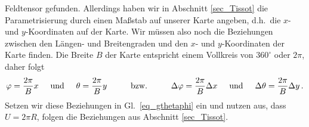 Feldtensor gefunden. Allerdings haben wir in Abschnitt \ref{sec_Tissot} die Parametrisierung durch einen
Ma\ss stab auf unserer Karte angeben, d.h.\ die $x$- und $y$-Koordinaten auf der Karte. Wir m\"ussen also noch
die Beziehungen zwischen den L\"angen- und Breitengraden und den $x$- und $y$-Koordinaten der Karte
finden. Die Breite $B$ der Karte entspricht einem Vollkreis von $360^\circ$ oder $2 \pi$, daher folgt
\begin{equation}
\label{eq_Beztheta_z1}
         \varphi = \frac{2\pi}{B} x  \hspace{0.5cm} {\rm und} \hspace{0.5cm} 
         \theta = \frac{2\pi}{B} y \hspace{1cm} {\rm bzw.} \hspace{1cm}
        \Delta \varphi = \frac{2\pi}{B} \Delta x \hspace{0.5cm} {\rm und} \hspace{0.5cm}  
        \Delta \theta = \frac{2\pi}{B} \Delta y  \, .
\end{equation}
Setzen wir diese Beziehungen in Gl.\ \ref{eq_gthetaphi} ein und nutzen aus, dass $U=2\pi R$, folgen die
Beziehungen aus Abschnitt \ref{sec_Tissot}. 

